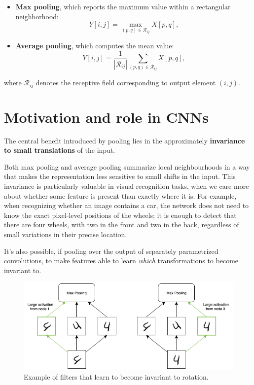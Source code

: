 \begin{itemize}
    \item \textbf{Max pooling}, which reports the maximum value within a rectangular \newline neighborhood:
    \begin{equation}
    Y[i,j] = \max_{(p,q) \in \mathcal{R}_{ij}} X[p,q],
    \end{equation}

    \item \textbf{Average pooling}, which computes the mean value:
    \begin{equation}
    Y[i,j] = \frac{1}{|\mathcal{R}_{ij}|} \sum_{(p,q) \in \mathcal{R}_{ij}} X[p,q],
    \end{equation}
\end{itemize}

where $\mathcal{R}_{ij}$ denotes the receptive field corresponding to output element $(i,j)$.  


\section{Motivation and role in CNNs}

The central benefit introduced by pooling lies in the approximately \textbf{invariance to small translations} of the input.

Both max pooling and average pooling summarize local neighbourhoods in a way that makes the representation less sensitive to small shifts in the input.  
This invariance is particularly valuable in visual recognition tasks, when we care more about whether some feature is present than exactly where it is. For example, when recognizing whether an image contains a car, the network does not need to know the exact pixel-level positions of the wheels; it is enough to detect that there are four wheels, with two in the front and two in the back, regardless of small variations in their precise location.

\clearpage

It's also possible, if pooling over the output of separately parametrized convolutions, to make features able to learn \textit{which} transformations to become invariant to.

\begin{figure} [H]
    \centering
    \includegraphics[width=0.7\linewidth]{Images/Chapters/pooling_invariance.png}
    \caption{Example of filters that learn to become invariant to rotation.}
    \label{fig:pooling_invariance}
\end{figure}

